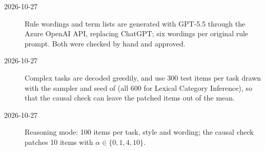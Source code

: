 \documentclass[11pt,a4paper]{article}
\begin{document}
\begin{description}
\item[2026-10-27] Rule wordings and term lists are generated with GPT-5.5 through the Azure OpenAI API, replacing ChatGPT; six wordings per original rule prompt. Both were checked by hand and approved.
\item[2026-10-27] Complex tasks are decoded greedily, and use 300 test items per task drawn with the sampler and seed of \citet{fu2026rules} (all 600 for Lexical Category Inference), so that the causal check can leave the patched items out of the mean.
\item[2026-10-27] Reasoning mode: 100 items per task, style and wording; the causal check patches 10 items with $\alpha\in\{0,1,4,10\}$.
\end{description}
\end{document}
